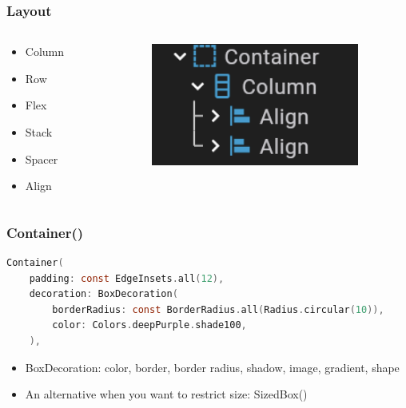 \documentclass[compress, aspectratio=32]{beamer}
\begin{document}
\begin{frame}
\begin{columns}
\begin{column}[]{0.5\textwidth}
        \end{column}
    \end{columns}
\end{frame}

\begin{frame}
    \frametitle{Layout}
    \begin{columns}
        \begin{column}[]{0.4\textwidth}
           \begin{itemize}
        \item Column
        \item Row
        \item Flex
        \item Stack
    \end{itemize}
    \begin{itemize}
        \item Spacer
        \item Align
    \end{itemize} 
        \end{column}
        \begin{column}[]{0.6\textwidth}
            \centering
            \includegraphics[width=0.8\textwidth]{column.png}
        \end{column}
    \end{columns}
    
\end{frame}
\begin{frame}[fragile]
    \frametitle{Container()}
    \begin{lstlisting}[language=c, firstnumber=140]
Container(
    padding: const EdgeInsets.all(12),
    decoration: BoxDecoration(
        borderRadius: const BorderRadius.all(Radius.circular(10)),
        color: Colors.deepPurple.shade100,
    ),
    \end{lstlisting}
    \begin{itemize}
        \item BoxDecoration: color, border, border radius, shadow, image, gradient, shape
        \item An alternative when you want to restrict size: SizedBox()
    \end{itemize}
\end{frame}
\end{document}
